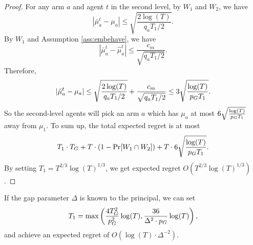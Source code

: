 \begin{proof}
For any arm $a$ and agent $t$ in the second level, by $W_1$ and $W_2$, we have
\[
|\bar{\mu}^t_a - \mu_a| \leq \sqrt{\frac{2\log(T)}{q_aT_1 /2}}.
\]
By $W_1$ and Assumption \ref{ass:embehave}, we have
\[
|\bar{\mu}^t_a - \hat{\mu}^t_a| \leq \frac{c_m}{\sqrt{q_aT_1/2}}.
\]
Therefore,
\[
|\hat{\mu}^t_a - \mu_a|\leq \sqrt{\frac{2\log(T)}{q_aT_1 /2}}+\frac{c_m}{\sqrt{q_aT_1/2}} \leq 3 \sqrt{\frac{\log(T)}{p_G T_1 }}.
\]
So the second-level agents will pick an arm $a$ which has $\mu_a$ at most $6 \sqrt{\frac{\log(T)}{p_G T_1 }}$ away from $\mu_1$. To sum up, the total expected regret is at most 
\[
T_1 \cdot T_G + T \cdot (1-\Pr[W_1 \cap W_2]) + T \cdot  6 \sqrt{\frac{\log(T)}{p_G T_1 }}.
\]
By setting $T_1 = T^{2/3}\log(T)^{1/3}$, we get expected regret $O(T^{2/3}\log(T)^{1/3})$.
\end{proof}


\begin{remark}
  If the gap parameter $\Delta$ is known to the principal, we can set
  $$T_1 = \max\left( \frac{4T_G^2}{p_G^2}\log(T), \frac{36 }{\Delta^2
      \cdot p_G} \log(T) \right),$$ and achieve an expected regret of
  $O(\log(T) \cdot \Delta^{-2})$.
\end{remark}

